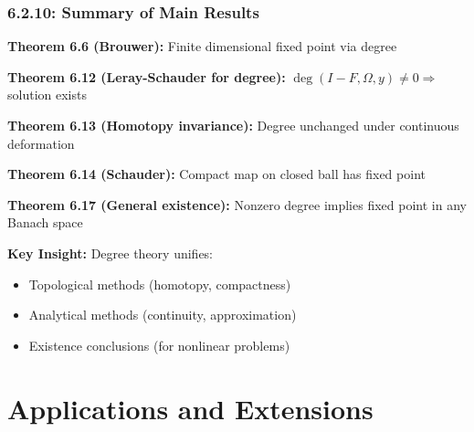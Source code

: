 \documentclass[aspectratio=169,10pt]{beamer}
\begin{document}
\begin{frame}
\frametitle{6.2.10: Summary of Main Results}

\textbf{Theorem 6.6 (Brouwer):} Finite dimensional fixed point via degree

\vspace{0.2cm}
\textbf{Theorem 6.12 (Leray-Schauder for degree):} $\deg(I - F, \Omega, y) \neq 0 \Rightarrow$ solution exists

\vspace{0.2cm}
\textbf{Theorem 6.13 (Homotopy invariance):} Degree unchanged under continuous deformation

\vspace{0.2cm}
\textbf{Theorem 6.14 (Schauder):} Compact map on closed ball has fixed point

\vspace{0.2cm}
\textbf{Theorem 6.17 (General existence):} Nonzero degree implies fixed point in any Banach space

\vspace{0.4cm}
\textbf{Key Insight:} Degree theory unifies:
\begin{itemize}
    \item Topological methods (homotopy, compactness)
    \item Analytical methods (continuity, approximation)
    \item Existence conclusions (for nonlinear problems)
\end{itemize}
\end{frame}


\section{Applications and Extensions}
\end{document}
